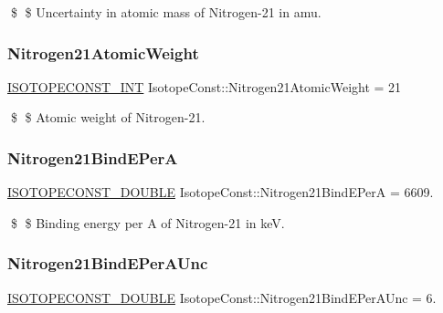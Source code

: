 \$ \$ Uncertainty in atomic mass of Nitrogen-\/21 in amu. \mbox{\label{group___isotope_const-_nitrogen-_n21_ga7a6d1a516153190810ceba9487b46f05}} 
\subsubsection{\texorpdfstring{Nitrogen21\+Atomic\+Weight}{Nitrogen21AtomicWeight}}
{\footnotesize\ttfamily \mbox{\hyperlink{group___isotope_const-_macros_ga5f18360b3e99483a35c32d789e62621c}{I\+S\+O\+T\+O\+P\+E\+C\+O\+N\+S\+T\+\_\+\+I\+NT}} Isotope\+Const\+::\+Nitrogen21\+Atomic\+Weight = 21}

\$ \$ Atomic weight of Nitrogen-\/21. \mbox{\label{group___isotope_const-_nitrogen-_n21_ga1754bea399648796d0126aa106092db3}} 
\subsubsection{\texorpdfstring{Nitrogen21\+Bind\+E\+PerA}{Nitrogen21BindEPerA}}
{\footnotesize\ttfamily \mbox{\hyperlink{group___isotope_const-_macros_ga8f45a7272ce02c0b4c65c44636ed719a}{I\+S\+O\+T\+O\+P\+E\+C\+O\+N\+S\+T\+\_\+\+D\+O\+U\+B\+LE}} Isotope\+Const\+::\+Nitrogen21\+Bind\+E\+PerA = 6609.}

\$ \$ Binding energy per A of Nitrogen-\/21 in keV. \mbox{\label{group___isotope_const-_nitrogen-_n21_gafac750aae3ad5642ab74bd12c84be92d}} 
\subsubsection{\texorpdfstring{Nitrogen21\+Bind\+E\+Per\+A\+Unc}{Nitrogen21BindEPerAUnc}}
{\footnotesize\ttfamily \mbox{\hyperlink{group___isotope_const-_macros_ga8f45a7272ce02c0b4c65c44636ed719a}{I\+S\+O\+T\+O\+P\+E\+C\+O\+N\+S\+T\+\_\+\+D\+O\+U\+B\+LE}} Isotope\+Const\+::\+Nitrogen21\+Bind\+E\+Per\+A\+Unc = 6.}

